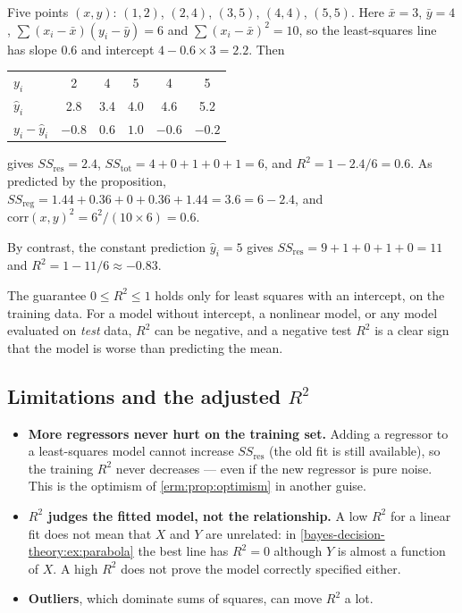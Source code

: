 \begin{notechapter}
\begin{example}\label{measuring-performance:ex:r2}
Five points $(x,y)$: $(1,2)$, $(2,4)$, $(3,5)$, $(4,4)$, $(5,5)$. Here
$\bar x = 3$, $\bar y = 4$, $\sum(x_i-\bar x)(y_i-\bar y) = 6$ and
$\sum(x_i - \bar x)^2 = 10$, so the least-squares line has slope $0.6$ and
intercept $4 - 0.6\times3 = 2.2$. Then
\begin{center}
\begin{tabular}{@{}lccccc@{}}
\toprule
$y_i$ & 2 & 4 & 5 & 4 & 5 \\
$\hat y_i$ & 2.8 & 3.4 & 4.0 & 4.6 & 5.2 \\
$y_i - \hat y_i$ & $-0.8$ & $0.6$ & $1.0$ & $-0.6$ & $-0.2$ \\
\bottomrule
\end{tabular}
\end{center}
gives $SS_{\mathrm{res}} = 2.4$, $SS_{\mathrm{tot}} = 4 + 0 + 1 + 0 + 1 = 6$, and
$R^2 = 1 - 2.4/6 = 0.6$. As predicted by the proposition,
$SS_{\mathrm{reg}} = 1.44 + 0.36 + 0 + 0.36 + 1.44 = 3.6 = 6 - 2.4$, and
$\mathrm{corr}(x,y)^2 = 6^2/(10\times6) = 0.6$.

By contrast, the constant prediction $\hat y_i = 5$ gives
$SS_{\mathrm{res}} = 9 + 1 + 0 + 1 + 0 = 11$ and $R^2 = 1 - 11/6\approx-0.83$.
\end{example}

\begin{pitfall}
The guarantee $0\leq R^2\leq1$ holds only for least squares with an intercept,
on the training data. For a model without intercept, a nonlinear model, or
any model evaluated on \emph{test} data, $R^2$ can be negative, and a negative
test $R^2$ is a clear sign that the model is worse than predicting the mean.
\end{pitfall}

\subsection{Limitations and the adjusted $R^2$}

\begin{itemize}
  \item \textbf{More regressors never hurt on the training set.} Adding a
        regressor to a least-squares model cannot increase $SS_{\mathrm{res}}$ (the
        old fit is still available), so the training $R^2$ never decreases ---
        even if the new regressor is pure noise. This is the optimism of
        \cref{erm:prop:optimism} in another guise.
  \item \textbf{$R^2$ judges the fitted model, not the relationship.} A low
        $R^2$ for a linear fit does not mean that $X$ and $Y$ are unrelated: in
        \cref{bayes-decision-theory:ex:parabola} the best line has $R^2 = 0$
        although $Y$ is almost a function of $X$. A high $R^2$ does not prove
        the model correctly specified either.
  \item \textbf{Outliers}, which dominate sums of squares, can move $R^2$ a
        lot.
\end{itemize}


\end{notechapter}
